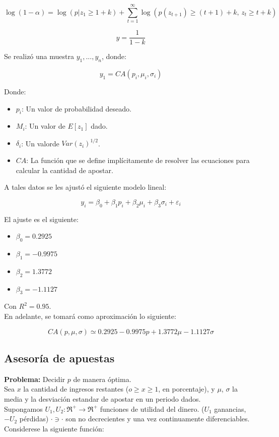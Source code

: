 \[\log (1-\alpha)=\log(p|z_1\ge 1+k)+\displaystyle\sum_{t=1}^{\infty}\log(p(z_{t+1})\ge (t+1)+k,\,z_t\ge t+k)\]

\[y=\frac{1}{1-k}\]

Se realizó una muestra $y_1,..., y_n$, donde:

\[y_1=CA(p_i,\mu_i,\sigma_i)\]

Donde:
\begin{itemize}
 \item $p_i$: Un valor de probabilidad deseado.
 \item $M_i$: Un valor de $E[z_1]$ dado.
 \item $\delta_i$: Un valorde $Var(z_i)^{1/2}$.
 \item $CA$: La función que se define implícitamente de resolver las ecuaciones para calcular la cantidad de apostar.
\end{itemize}

A tales datos se les ajustó el siguiente modelo lineal:

\[y_i=\beta_0+\beta_1p_i+\beta_2\mu_i+\beta_3\sigma_i+\varepsilon_i\]

\newpage

El ajuste es el siguiente:

\begin{itemize}
 \item $\beta_0=0.2925$
  \item $\beta_1=-0.9975$
 \item $\beta_2=1.3772$
 \item $\beta_3=-1.1127$
\end{itemize}

Con $R^2=0.95$.\\

En adelante, se tomará como aproximación lo siguiente:

\[CA(p,\mu,\sigma)\simeq0.2925-0.9975p+1.3772\mu-1.1127\sigma\]

\subsection{Asesoría de apuestas}
{\bf Problema:} Decidir $p$ de manera óptima.\\

Sea $x$ la cantidad de ingresos restantes ($o\ge x\ge1$, en porcentaje), y $\mu$, $\sigma$ la media y la desviación estandar de apostar en un periodo dados.\\

Supongamos $U_1,U_2: \Re^+\rightarrow \Re^+$ funciones de utilidad del dinero. ($U_1$ ganancias, $-U_2$ pérdidas) $\cdot\ni\cdot$ son no decrecientes y una vez continuamente diferenciables. Considerese la siguiente función:\\

